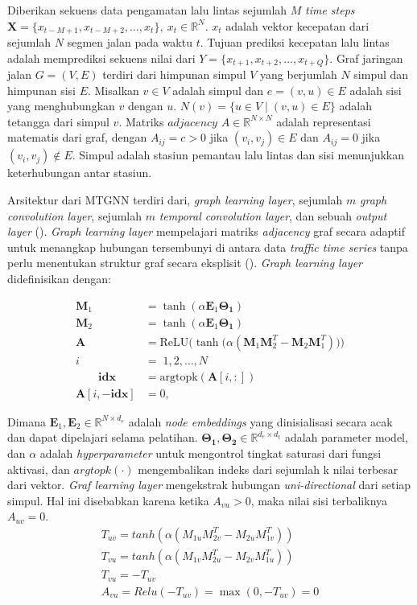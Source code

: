Diberikan sekuens data pengamatan lalu lintas sejumlah $M$ \textit{time steps} $\textbf{X}=\{x_{t-M+1},x_{t-M+2},\ldots,x_{t} \}, \ x_t\in \mathbb{R}^N$. $x_t$ adalah vektor kecepatan dari sejumlah $N$ segmen jalan pada waktu $t$. Tujuan prediksi kecepatan lalu lintas adalah memprediksi sekuens nilai dari $Y=\{x_{t+1},x_{t+2},\ldots,x_{t+Q}\}$. Graf jaringan jalan $G=(V,E)$ terdiri dari himpunan simpul $V$ yang berjumlah $N$ simpul dan himpunan sisi $E$. Misalkan $v\in V$ adalah simpul dan $e=(v,u)\in E$ adalah sisi yang menghubungkan $v$ dengan $u$. $N(v)=\{u\in V\mid (v,u)\in E\}$ adalah tetangga dari simpul $v$. Matriks $adjacency$ $A\in \mathbb{R}^{N\times N}$ adalah representasi matematis dari graf, dengan $A_{ij}=c>0$ jika $(v_i,v_j)\in E$ dan $A_{ij}=0$ jika $(v_i,v_j)\notin E$. Simpul adalah stasiun pemantau lalu lintas dan sisi menunjukkan keterhubungan antar stasiun.


Arsitektur dari MTGNN terdiri dari, \textit{graph learning layer}, sejumlah $m$ \textit{graph convolution layer}, sejumlah $m$ \textit{temporal convolution layer}, dan sebuah \textit{output layer} (\cite{Wu2020}). \textit{Graph learning layer} mempelajari matriks \textit{adjacency} graf secara adaptif untuk menangkap hubungan tersembunyi di antara data \textit{traffic time series} tanpa perlu menentukan struktur graf secara eksplisit (\cite{Wu2020}). \textit{Graph learning layer} didefinisikan dengan:

\begin{align}
    \mathbf{M}_1 &= \tanh(\alpha \mathbf{E}_1 \mathbf{\Theta_1})\\
    \mathbf{M}_2 &= \tanh(\alpha \mathbf{E}_1 \mathbf{\Theta_1})\\
    \mathbf{A} &= \mathrm{ReLU}\bigl(\tanh\bigl(\alpha(\mathbf{M}_1\mathbf{M}_2^{T}-\mathbf{M}_2\mathbf{M}_1^{T})\bigr)\bigr) \\ 
    i \; &= \; 1,2,\ldots,N \\
   \hspace{2em}  \mathbf{idx} &= \mathrm{argtopk}(\mathbf{A}[i,:])\\
     \mathbf{A}[i,-\mathbf{idx}] &= 0, 
\end{align}

Dimana $\mathbf{E}_1,\mathbf{E}_2\in \mathbb{R}^{N\times d_e}$ adalah \textit{node embeddings} yang dinisialisasi secara acak dan dapat dipelajari selama pelatihan. $\mathbf{\Theta_1},\mathbf{\Theta_2}\in \mathbb{R}^{d_e \times d_t}$ adalah parameter model, dan $\alpha$ adalah \textit{hyperparameter} untuk mengontrol tingkat saturasi dari fungsi aktivasi, dan $argtopk(\cdot)$ mengembalikan indeks dari sejumlah k nilai terbesar dari vektor.\textit{ Graf learning layer} mengekstrak hubungan \textit{uni-directional} dari setiap simpul. Hal ini disebabkan karena ketika $A_{vu}>0$, maka nilai sisi terbaliknya $A_{uv}=0$. 
\begin{align}
    T_{uv}=tanh(\alpha(M_{1u}M_{2v}^T-M_{2u}M_{1v}^T))\\
    T_{vu}=tanh(\alpha(M_{1v}M_{2u}^T-M_{2v}M_{1u}^T))\\
    T_{vu}=-T_{uv}\\
    A_{vu}=Relu(-T_{uv})=\max (0,-T_{uv})=0
\end{align}

